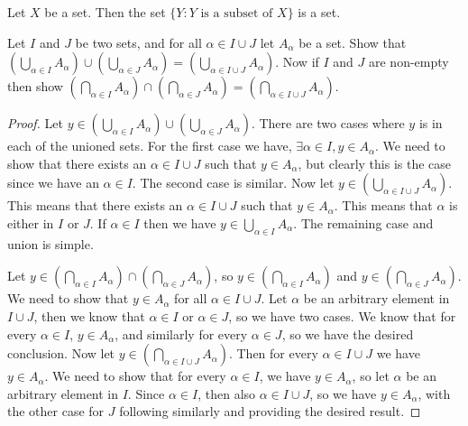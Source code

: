 \documentclass[12pt]{article}
\newenvironment{lemma}[2][Lemma]{\begin{trivlist}
\item[\hskip \labelsep {\bfseries #1}\hskip \labelsep {\bfseries #2}]}{\end{trivlist}}
\newenvironment{exercise}[2][Exercise]{\begin{trivlist}
\item[\hskip \labelsep {\bfseries #1}\hskip \labelsep {\bfseries #2}]}{\end{trivlist}}
\begin{document}
\begin{lemma}{3.4.9}
	Let $ X $ be a set.
	Then the set $ \{ Y : Y \text{ is a subset of } X \} $ is a set.
\end{lemma}

\begin{exercise}{3.4.10}
	Let $ I $ and $ J $ be two sets, and for all $ \alpha \in I \cup J $ let $ A_{\alpha} $ be a set.
	Show that $ (\bigcup_{\alpha \in I} A_{\alpha}) \cup (\bigcup_{\alpha \in J} A_{\alpha}) = (\bigcup_{\alpha \in I \cup J} A_{\alpha}) $.
	Now if $ I $ and $ J $ are non-empty then show $ (\bigcap_{\alpha \in I} A_{\alpha}) \cap (\bigcap_{\alpha \in J} A_{\alpha}) = (\bigcap_{\alpha \in I \cup J} A_{\alpha}) $.
\end{exercise}
\begin{proof}
	Let $ y \in (\bigcup_{\alpha \in I} A_{\alpha}) \cup (\bigcup_{\alpha \in J} A_{\alpha}) $.
	There are two cases where $ y $ is in each of the unioned sets.
	For the first case we have, $ \exists \alpha \in I, y \in A_{\alpha} $.
	We need to show that there exists an $ \alpha \in I \cup J $ such that $ y \in A_{\alpha} $, but clearly this is the case since we have an $ \alpha \in I $.
	The second case is similar.
	Now let $ y \in (\bigcup_{\alpha \in I \cup J} A_{\alpha}) $.
	This means that there exists an $ \alpha \in I \cup J $ such that $ y \in A_{\alpha} $.
	This means that $ \alpha $ is either in $ I $ or $ J $.
	If $ \alpha \in I $ then we have $ y \in \bigcup_{\alpha \in I} A_{\alpha} $.
	The remaining case and union is simple.
	
	Let $ y \in (\bigcap_{\alpha \in I} A_{\alpha}) \cap (\bigcap_{\alpha \in J} A_{\alpha}) $, so $ y \in (\bigcap_{\alpha \in I} A_{\alpha}) $ and $ y \in (\bigcap_{\alpha \in J} A_{\alpha}) $.
	We need to show that $ y \in A_{\alpha} $ for all $ \alpha \in I \cup J $.
	Let $ \alpha $ be an arbitrary element in $ I \cup J $, then we know that $ \alpha \in I $ or $ \alpha \in J $, so we have two cases.
	We know that for every $ \alpha \in I $, $ y \in A_{\alpha} $, and similarly for every $ \alpha \in J $, so we have the desired conclusion.
	Now let $ y \in (\bigcap_{\alpha \in I \cup J} A_{\alpha}) $.
	Then for every $ \alpha \in I \cup J $ we have $ y \in A_{\alpha} $.
	We need to show that for every $ \alpha \in I $, we have $ y \in A_{\alpha} $, so let $ \alpha $ be an arbitrary element in $ I $.
	Since $ \alpha \in I $, then also $ \alpha \in I \cup J $, so we have $ y \in A_{\alpha} $, with the other case for $ J $ following similarly and providing the desired result.
\end{proof}
\end{document}
